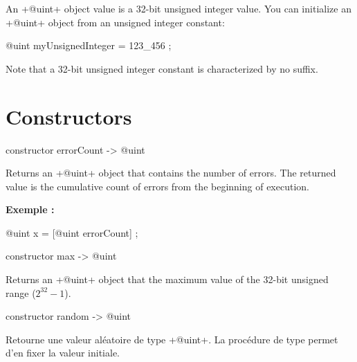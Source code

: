 



An \ggst+@uint+ object value is a 32-bit unsigned integer value. You can initialize an \ggst+@uint+ object from an unsigned integer constant:\\

\begin{galgas3}
@uint myUnsignedInteger = 123_456 ;
\end{galgas3}

Note that a 32-bit unsigned integer constant is characterized by no suffix.

\section{Constructors}


\begin{galgas3}
constructor errorCount -> @uint
\end{galgas3}


Returns an \ggst+@uint+ object that contains the number of errors. The returned value is the cumulative count of errors from the beginning of execution.

\textbf{Exemple :}
\begin{galgas3}
@uint x = [@uint errorCount] ;
\end{galgas3}





\begin{galgas3}
constructor max -> @uint
\end{galgas3}

Returns an \ggst+@uint+ object that the maximum value of the 32-bit unsigned range ($2^{32}-1$).







\begin{galgas3}
constructor random -> @uint
\end{galgas3}

Retourne une valeur aléatoire de type \ggst+@uint+. La procédure de type  permet d'en fixer la valeur initiale.

